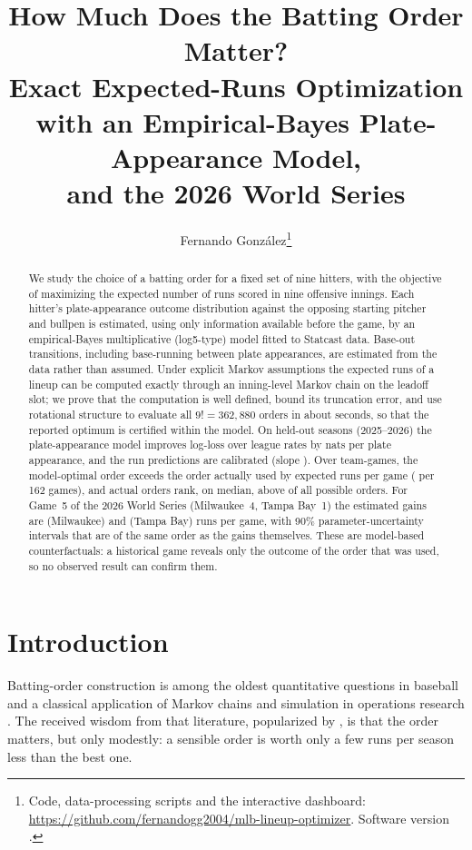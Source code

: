 \documentclass[11pt]{article}
\title{How Much Does the Batting Order Matter?\\[2pt]
\large Exact Expected-Runs Optimization with an Empirical-Bayes Plate-Appearance Model,\\
and the 2026 World Series}
\author{Fernando Gonz\'alez\thanks{Code, data-processing scripts and the interactive dashboard:
\url{https://github.com/fernandogg2004/mlb-lineup-optimizer}. Software version \texttt{\SoftwareVersion}.}}
\date{\PaperDate}
\theoremstyle{definition}
\theoremstyle{remark}
\begin{document}
\maketitle

\begin{abstract}
We study the choice of a batting order for a fixed set of nine hitters, with the objective of
maximizing the expected number of runs scored in nine offensive innings. Each hitter's
plate-appearance outcome distribution against the opposing starting pitcher and bullpen is
estimated, using only information available before the game, by an empirical-Bayes
multiplicative (log5-type) model fitted to Statcast data. Base-out transitions, including
base-running between plate appearances, are estimated from the data rather than assumed. Under
explicit Markov assumptions the expected runs of a lineup can be computed exactly through an
inning-level Markov chain on the leadoff slot; we prove that the computation is well defined,
bound its truncation error, and use rotational structure to evaluate all $9!=362{,}880$ orders in
about \EfouraExhaustiveSeconds{} seconds, so that the reported optimum is certified within the model.
On held-out seasons (2025--2026) the plate-appearance model improves log-loss over league
rates by \EtwoGainMtwoVsMzero{} nats per plate appearance, and the run predictions are
calibrated (slope \EthreeSlope{}). Over \EfourbN{} team-games, the model-optimal order exceeds the
order actually used by \EfourbUpliftMean{} expected runs per game (\EfourbUpliftSeason{} per
162 games), and actual orders rank, on median, above \EfourbPctMedian{} of all possible orders.
For Game~5 of the 2026 World Series (Milwaukee~4, Tampa Bay~1) the estimated gains are
\RefUpliftAway{} (Milwaukee) and \RefUpliftHome{} (Tampa Bay) runs per game, with 90\%
parameter-uncertainty intervals that are of the same order as the gains themselves. These are model-based
counterfactuals: a historical game reveals only the outcome of the order that was used, so no
observed result can confirm them.
\end{abstract}

\tableofcontents

\section{Introduction}

Batting-order construction is among the oldest quantitative questions in baseball and a classical
application of Markov chains and simulation in operations research
\cite{lindsey1963,freeze1974,cover1977,dEsopo1977,pankin1978,bukiet1997,sokol2003}. The
received wisdom from that literature, popularized by \citet{tango2007}, is that the order matters,
but only modestly: a sensible order is worth only a few runs per season less than the best one.
\end{document}
